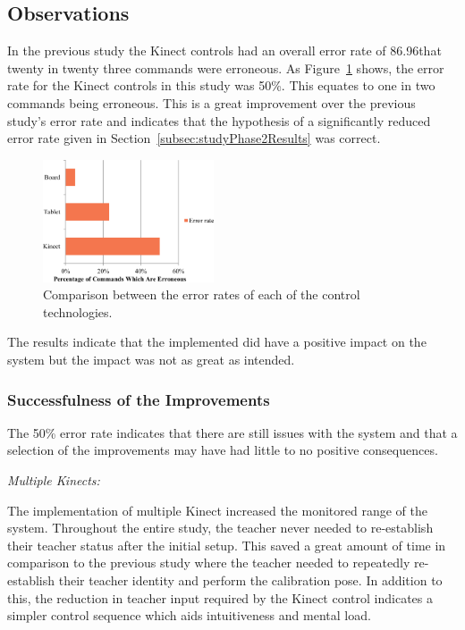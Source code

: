 \documentclass[link]{IWCOMP}
\begin{document}
\subsection{Observations}
\label{subsec:studyPhase2Observations}


In the previous study the Kinect controls had an overall error rate of 86.96\meaning that twenty in twenty three commands were erroneous.
As Figure~\ref{fig:controlDevicesErrors} shows, the error rate for the Kinect controls in this study was 50\%.
This equates to one in two commands being erroneous.
This is a great improvement over the previous study's error rate and indicates that the hypothesis of a significantly reduced error rate given in Section~\ref{subsec:studyPhase2Results} was correct.

\begin{figure}[h]
  \centering
  \includegraphics[width=0.45\textwidth]{figures/bar_chart_errors.png}
  \caption{Comparison between the error rates of each of the control technologies.}
  \label{fig:controlDevicesErrors}
\end{figure}

The results indicate that the implemented did have a positive impact on the system but the impact was not as great as intended.

\subsubsection{Successfulness of the Improvements}
\label{subsubsec:studyPhase2ObservationsSuccess}

The 50\% error rate indicates that there are still issues with the system and that a selection of the improvements may have had little to no positive consequences.

\emph{Multiple Kinects:}

The implementation of multiple Kinect increased the monitored range of the system.
Throughout the entire study, the teacher never needed to re-establish their teacher status after the initial setup.
This saved a great amount of time in comparison to the previous study where the teacher needed to repeatedly re-establish their teacher identity and perform the calibration pose.
In addition to this, the reduction in teacher input required by the Kinect control indicates a simpler control sequence which aids intuitiveness and mental load.
\end{document}
